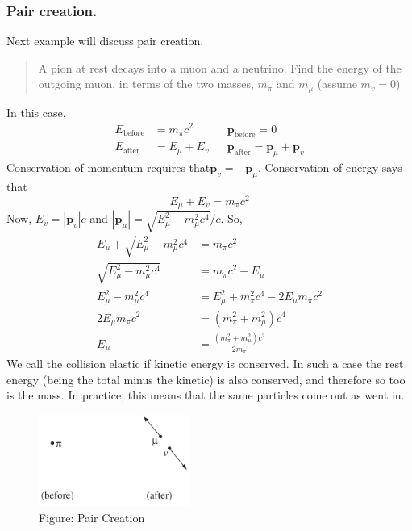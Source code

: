 \documentclass[../main.tex]{subfiles}
\begin{document}
\subsubsection*{Pair creation.} Next example will discuss pair creation. 
\begin{quote}
    A pion at rest decays into a muon and a neutrino. Find the energy of the outgoing muon, in terms of the two masses, $m_\pi$ and $m_\mu$ (assume $m_v = 0$)
\end{quote}
In this case,
\begin{align*}
    E_{\text{before}}&=m_\pi c^2&&\mathbf{p}_{\text{before}}=0\\
    E_{\text{after}}&=E_\mu+E_v&&\mathbf{p}_{\text{after}}=\mathbf{p}_\mu+\mathbf{p}_v
\end{align*}
Conservation of momentum requires that$ \mathbf{p}_v = -\mathbf{p}_\mu$. Conservation of energy says that
\begin{equation*}
   E_\mu+E_v= m_\pi c^2
\end{equation*}
Now, $E_v = |\mathbf{p}_v |c$ and $| \mathbf{p}_\mu |=\sqrt{E_\mu^2-m^2_\mu c^4}/c$. So,
\begin{align*}
    E_\mu+\sqrt{E_\mu^2-m^2_\mu c^4}&=m_\pi c^2\\
    \sqrt{E_\mu^2-m^2_\mu c^4}&=m_\pi c^2-E_\mu\\
    E_\mu^2-m^2_\mu c^4&=E_\mu^2+m_\pi^2 c^4-2E_\mu m_\pi c^2\\
    2E_\mu m_\pi c^2&=(m_\pi^2+m^2_\mu)c^4\\
    E_\mu&=\frac{(m^2_\pi+m^2_\mu)c^2}{2m_\pi}
\end{align*}
We call the collision elastic if kinetic energy is conserved. In such a case the rest energy (being the total minus the kinetic) is also conserved, and therefore so too is the mass. In practice, this means that the same particles come out as went in. 
\begin{figure}[t]
    \centering
    \includegraphics[height=3cm]{../Rss/Relativity/Appendix/PairCreation.png}
    \caption*{Figure: Pair Creation}
\end{figure}
\end{document}

